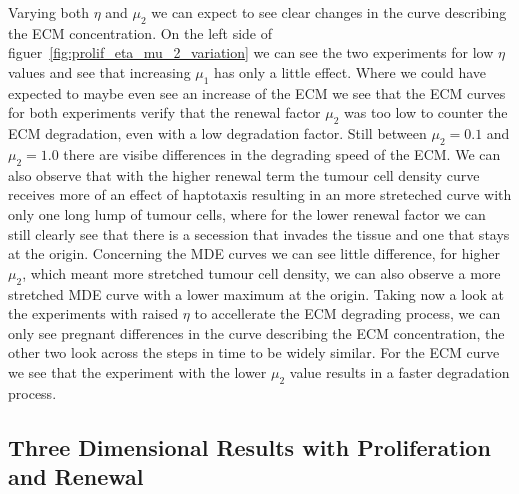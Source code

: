 Varying both $\eta$ and $\mu_2$ we can expect to see clear changes in the curve describing the ECM concentration. On the left side of figuer~\ref{fig:prolif_eta_mu_2_variation} we can see the two experiments for low $\eta$ values and see that increasing $\mu_1$ has only a little effect. Where we could have expected to maybe even see an increase of the ECM we see that the ECM curves for both experiments verify that the renewal factor $\mu_2$ was too low to counter the ECM degradation, even with a low degradation factor. Still between $\mu_2=0.1$ and $\mu_2=1.0$ there are visibe differences in the degrading speed of the ECM. We can also observe that with the higher renewal term the tumour cell density curve receives more of an effect of haptotaxis resulting in an more streteched curve with only one long lump of tumour cells, where for the lower renewal factor we can still clearly see that there is a secession that invades the tissue and one that stays at the origin. Concerning the MDE curves we can see little difference, for higher $\mu_2$, which meant more stretched tumour cell density, we can also observe a more stretched MDE curve with a lower maximum at the origin. \newline 
Taking now a look at the experiments with raised $\eta$ to accellerate the ECM degrading process, we can only see pregnant differences in the curve describing the ECM concentration, the other two look across the steps in time to be widely similar. For the ECM curve we see that the experiment with the lower $\mu_2$ value results in a faster degradation process.




\subsection{Three Dimensional Results with Proliferation and Renewal}
\lipsum[1-3]




